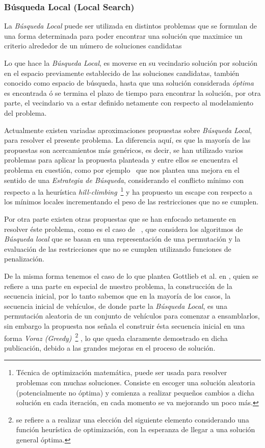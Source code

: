 \subsubsection{Búsqueda Local (Local Search)}
La \emph{Búsqueda Local} puede ser utilizada en distintos problemas que se formulan
de una forma determinada para poder encontrar una solución que maximice un criterio alrededor de un número
de soluciones candidatas

Lo que hace la \emph{Búsqueda Local}, es moverse en su vecindario solución por solución en el espacio previamente establecido
de las soluciones candidatas, también conocido como espacio de búsqueda, hasta que una solución considerada \emph{óptima}
es encontrada ó se termina el plazo de tiempo para encontrar la solución, por otra parte, 
el vecindario va a estar definido netamente con respecto al modelamiento del problema.

Actualmente existen variadas aproximaciones propuestas sobre \emph{Búsqueda Local},
para resolver el presente problema.
La diferencia aquí, es que la mayoría de las propuestas son acercamientos más
genéricos, es decir, se han utilizado varios problemas para aplicar la propuesta
planteada y entre ellos se encuentra el problema en cuestión, como por ejemplo~\cite{DTWZ94}
que nos plantea una mejora en el sentido de una \emph{Estrategia de Búsqueda}, considerando
el conflicto mínimo con respecto a la heurística \emph{hill-climbing}~\footnote{
Técnica de optimización matemática, puede ser usada para resolver problemas con muchas soluciones.
Consiste en escoger una solución aleatoria (potencialmente no óptima) y comienza a
realizar pequeños cambios a dicha solución en cada iteración, en cada momento se va mejorando un poco más.
}
y ha propuesto un escape con respecto a los mínimos locales incrementando el peso de las
restricciones que no se cumplen.

Por otra parte existen otras propuestas que se han enfocado netamente en resolver éste problema,
como es el caso de ~\cite{PG02}, que considera los algoritmos de \emph{Búsqueda local}
que se basan en una representación de una permutación y la evaluación de las restricciones que no se
cumplen utilizando funciones de penalización.

De la misma forma tenemos el caso de lo que plantea Gottlieb et al. en \cite{GPS03}, quien se refiere
a una parte en especial de nuestro problema, la construcción de la secuencia inicial, por lo tanto
sabemos que en la mayoría de los casos, la secuencia inicial de vehículos, de donde parte la
\emph{Búsqueda Local}, es una permutación aleatoria de un conjunto de vehículos para comenzar
a ensamblarlos, sin embargo la propuesta nos señala el construir ésta secuencia inicial en una forma
\emph{Voraz (Greedy)}~\footnote{
se refiere a a realizar una elección del siguiente elemento considerando una función heurística de optimización,
con la esperanza de llegar a una solución general óptima.
}
, lo que queda claramente demostrado en dicha publicación,
debido a las grandes mejoras en el proceso de solución.

